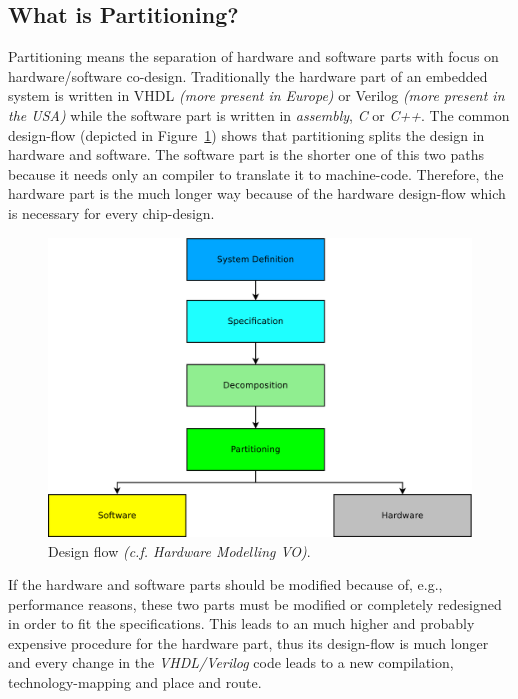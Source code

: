 \documentclass{article}
\begin{document}
	  \subsection{What is Partitioning?}
	  Partitioning means the separation of hardware and software parts with focus on hardware/software co-design.
	  Traditionally the hardware part of an embedded system is written in VHDL \textit{(more present in Europe)} or Verilog \textit{(more present in the USA)} while the software part is written in \textit{assembly}, \textit{C} or \textit{C++}.
	  The common design-flow (depicted in Figure~\ref{fig:flow}) shows that partitioning splits the design in hardware and software.
	  The software part is the shorter one of this two paths because it needs only an compiler to translate it to machine-code. Therefore, the hardware part is the much longer way because of the hardware design-flow which is necessary for every chip-design.
	    \begin{figure}[hp]
	      \centering
	      \includegraphics[scale=0.18]{../pictures/flow.pdf}
	      \caption{Design flow \textit{(c.f. Hardware Modelling VO)}.}
	      \label{fig:flow}
	    \end{figure}  
	  If the hardware and software parts should be modified because of, e.g., performance reasons, these two parts must be modified or completely redesigned in order to fit the specifications.
	  This leads to an much higher and probably expensive procedure for the hardware part, thus its design-flow is much longer and every change in the \textit{VHDL/Verilog} code leads to a new compilation, technology-mapping and place and route. %
	
\end{document}
